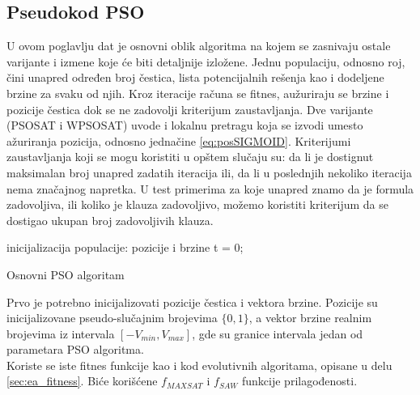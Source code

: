 \documentclass[a4paper]{article}
\begin{document}
\subsection{Pseudokod PSO}
\label{sec:pso_pseudokod}
U ovom poglavlju dat je osnovni oblik algoritma na kojem se zasnivaju ostale varijante
i izmene koje će biti detaljnije izložene. Jednu populaciju, odnosno roj, čini unapred
određen broj čestica, lista potencijalnih rešenja 
kao i dodeljene brzine za svaku od njih.
Kroz iteracije računa se fitnes, aužuriraju se brzine i pozicije čestica dok se ne
zadovolji kriterijum zaustavljanja. 
Dve varijante (PSOSAT i WPSOSAT) uvode i lokalnu pretragu koja se izvodi umesto 
ažuriranja pozicija, odnosno jednačine \ref{eq:posSIGMOID}.
Kriterijumi zaustavljanja koji se mogu koristiti u opštem slučaju su: 
da li je dostignut maksimalan broj unapred zadatih iteracija ili, da li u poslednjih
nekoliko iteracija nema značajnog napretka.
U test primerima za koje unapred znamo da je formula zadovoljiva, ili koliko je klauza
zadovoljivo, možemo koristiti kriterijum da se dostigao ukupan broj zadovoljivih klauza.\\

\begin{algorithm}[H]
\SetAlgoLined
{}

\BlankLine
 inicijalizacija populacije: pozicije i brzine\;
 t = 0; \\
\caption{Osnovni PSO algoritam}
\end{algorithm}


Prvo je potrebno inicijalizovati pozicije čestica i vektora brzine. 
Pozicije su inicijalizovane pseudo-slučajnim brojevima $\{0,1\}$, 
a vektor brzine realnim brojevima iz intervala $[-V_{min}, V_{max}]$, 
gde su granice intervala jedan od parametara PSO algoritma.\\

Koriste se iste fitnes funkcije kao i kod evolutivnih algoritama, opisane u delu
 \ref{sec:ea_fitness}. Biće korišćene $f_{MAXSAT}$ i $f_{SAW}$ funkcije prilagođenosti.\\
\end{document}
